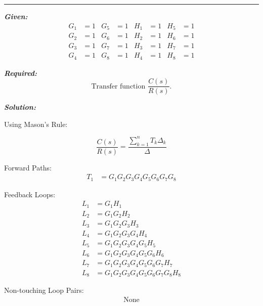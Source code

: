 \documentclass[11pt]{article}
\begin{document}
\noindent\rule{\textwidth}{1pt}

\vspace{12pt}

\noindent\textbf{\textit{Given:}}
\[
\begin{aligned}
G_1 &= 1 & G_5 &= 1 & H_1 &= 1 & H_5 &= 1 \\
G_2 &= 1 & G_6 &= 1 & H_2 &= 1 & H_6 &= 1 \\
G_3 &= 1 & G_7 &= 1 & H_3 &= 1 & H_7 &= 1 \\
G_4 &= 1 & G_8 &= 1 & H_4 &= 1 & H_8 &= 1
\end{aligned}
\]

\vspace{12pt}

\noindent\textbf{\textit{Required:}}
\[
\text{Transfer function } \frac{C(s)}{R(s)}.
\]

\vspace{12pt}

\noindent \textbf{\textit{Solution:}}

\vspace{2pt}
{Using Mason's Rule:}

\[
\frac{C(s)}{R(s)} = \frac{\sum_{k=1}^{n} T_k \Delta_k}{\Delta}
\]

Forward Paths:
\begin{align*}
T_1 &= G_1 G_2 G_3 G_4 G_5 G_6 G_7 G_8
\end{align*}

\vspace{0.5em}

Feedback Loops:
\begin{align*}
L_1 &= G_1 H_1 \\
L_2 &= G_1 G_2 H_2 \\
L_3 &= G_1 G_2 G_3 H_3 \\
L_4 &= G_1 G_2 G_3 G_4 H_4 \\
L_5 &= G_1 G_2 G_3 G_4 G_5 H_5 \\
L_6 &= G_1 G_2 G_3 G_4 G_5 G_6 H_6 \\
L_7 &= G_1 G_2 G_3 G_4 G_5 G_6 G_7 H_7 \\
L_8 &= G_1 G_2 G_3 G_4 G_5 G_6 G_7 G_8 H_8
\end{align*}

\vspace{0.5em}

Non-touching Loop Pairs:
\begin{align*}
\text{None}
\end{align*}

\vspace{0.5em}
\end{document}

